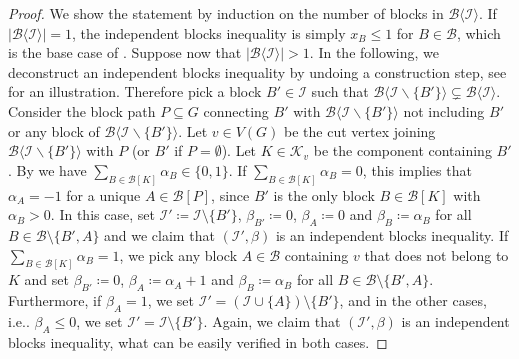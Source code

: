 \documentclass[12pt]{amsart}
\newcommand{\K}{\mathcal{K}}
\newcommand{\I}{\mathcal{I}}
\newcommand{\B}{\mathcal{B}}
\begin{document}
\begin{proof}
We show the statement by induction on the number of blocks in $\B \langle \I \rangle$. If $\vert \B \langle \I \rangle \vert =1$, the independent blocks inequality is simply $x_B \le 1$ for $B \in \B$, which is the base case of . Suppose now that $\vert \B \langle \I \rangle \vert >1$. In the following, we deconstruct an independent blocks inequality by undoing a construction step, see  for an illustration. Therefore pick a block $B' \in \I$ such that $\B\langle\I\backslash \{B'\}\rangle \subsetneq \B\langle\I\rangle$. Consider the block path $P \subseteq G$ connecting $B'$ with $\B\langle\I\backslash \{B'\}\rangle$ not including $B'$ or any block of $\B\langle\I\backslash \{B'\}\rangle$. Let $v \in V(G)$ be the cut vertex joining $\B\langle\I\backslash \{B'\}\rangle$ with $P$ (or $B'$ if $P=\emptyset$). Let $K \in \K_v$ be the component containing $B'$. By  we have $\sum_{B \in \B[K]}\alpha_B \in \{0,1\}$. If $\sum_{B \in \B[K]}\alpha_B =0$, this implies that $\alpha_A=-1$ for a unique $A \in \B[P]$, since $B'$ is the only block $B\in \B[K]$ with $\alpha_B>0$. In this case, set $\I'\coloneqq \I \setminus \{B'\}$, $\beta_{B'} \coloneqq0$,  $\beta_{A}\coloneqq 0$ and $\beta_B\coloneqq \alpha_B$ for all $B \in \B\setminus\{B',A\}$ and we claim that $(\I',\beta)$ is an independent blocks inequality. If $\sum_{B \in \B[K]}\alpha_B =1$, we pick any block $A \in \B$ containing $v$ that does not belong to $K$ and set $\beta_{B'}\coloneqq 0$, $\beta_{A}\coloneqq \alpha_{A}+1$ and $\beta_B\coloneqq \alpha_B$ for all $B \in \B \setminus \{B',A\}$. Furthermore, if $\beta_{A}=1$, we set $\I'=(\I \cup \{A\})\setminus\{B'\}$, and in the other cases, i.e.. $\beta_{A} \le 0$, we set $\I'=\I \setminus \{B'\}$. Again, we claim that $(\I',\beta)$ is an independent blocks inequality, what can be easily verified in both cases.
\end{proof}
\end{document}
